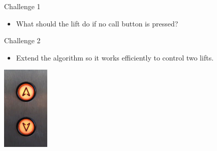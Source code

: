 \documentclass{beamer} %
\begin{document}
  
\begin{frame}
  \begin{block}{Challenge 1}
    \begin{itemize}
    \item What should the lift do if no call button is pressed?
    \end{itemize}
  \end{block}
  \centering
  \begin{block}{Challenge 2}
    \begin{itemize}
    \item Extend the algorithm so it works efficiently to control two lifts.
    \end{itemize}
  \end{block}
  \centering
  \includegraphics[height=40mm]{img/elevator.jpg}
\end{frame}


\end{document}
